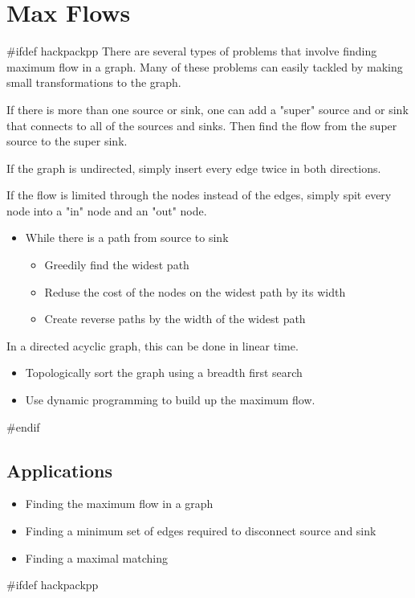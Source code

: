 \section{Max Flows}
#ifdef hackpackpp
There are several types of problems that involve finding maximum flow in a graph.
Many of these problems can easily tackled by making small transformations to the graph.


If there is more than one source or sink, one can add a "super" source and or sink that connects to all of the sources and sinks.
Then find the flow from the super source to the super sink.


If the graph is undirected, simply insert every edge twice in both directions.


If the flow is limited through the nodes instead of the edges, simply spit every node into a "in" node and an "out" node.


\begin{itemize}
	\item While there is a path from source to sink
	\begin{itemize}
		\item Greedily find the widest path
		\item Reduse the cost of the nodes on the widest path by its width
		\item Create reverse paths by the width of the widest path
	\end{itemize}
\end{itemize}

In a directed acyclic graph, this can be done in linear time.

\begin{itemize}
	\item Topologically sort the graph using a breadth first search
	\item Use dynamic programming to build up the maximum flow.
\end{itemize}
#endif

\subsection{Applications}
\begin{itemize}
	\item Finding the maximum flow in a graph
	\item Finding a minimum set of edges required to disconnect source and sink
	\item Finding a maximal matching
\end{itemize}
#ifdef hackpackpp

